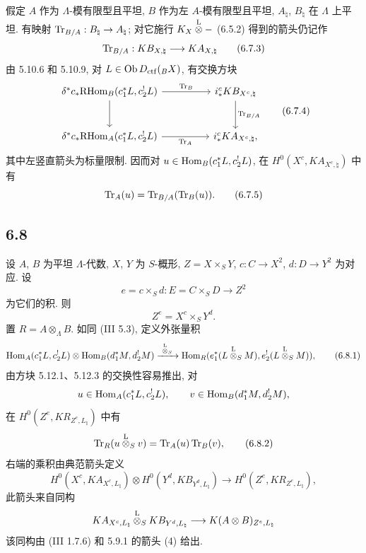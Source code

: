 假定 $A$ 作为 $\Lambda$-模有限型且平坦, $B$ 作为左 $A$-模有限型且平坦, $A_{\natural}$, $B_{\natural}$ 在 $\Lambda$ 上平坦. 有映射 $\operatorname{Tr}_{B/A}:B_{\natural}\to A_{\natural}$; 对它施行 $K_X\overset{\mathrm L}{\otimes} -$ (6.5.2) 得到的箭头仍记作
\begin{equation}
\operatorname{Tr}_{B/A}:KB_{X,\natural}\longrightarrow KA_{X,\natural}
\tag{6.7.3}
\end{equation}
由 5.10.6 和 5.10.9, 对 $L\in\operatorname{Ob} D_{\mathrm{ctf}}({}_BX)$, 有交换方块
\begin{equation}
\begin{tikzcd}[column sep=huge,row sep=large]
\delta^*c_*\RHom_B(c_1^*L,c_2^!L) \arrow[r,"\Tr_B"] \arrow[d]
& i_*^cKB_{X^c,\natural} \arrow[d,"\Tr_{B/A}"]\\
\delta^*c_*\RHom_A(c_1^*L,c_2^!L) \arrow[r,"\Tr_A"']
& i_*^cKA_{X^c,\natural},
\end{tikzcd}
\tag{6.7.4}
\end{equation}
其中左竖直箭头为标量限制. 因而对 $u\in\operatorname{Hom}_B(c_1^*L,c_2^!L)$, 在 $H^0(X^c,KA_{X^c,\natural})$ 中有
\begin{equation}
\operatorname{Tr}_A(u)=\operatorname{Tr}_{B/A}(\operatorname{Tr}_B(u)).
\tag{6.7.5}
\end{equation}

\subsection*{6.8}
设 $A$, $B$ 为平坦 $\Lambda$-代数, $X$, $Y$ 为 $S$-概形, $Z=X\times_SY$, $c:C\to X^2$, $d:D\to Y^2$ 为对应. 设
\[
e=c\times_Sd:E=C\times_SD\longrightarrow Z^2
\]
为它们的积. 则
\[
Z^e=X^c\times_SY^d.
\]
置 $R=A\otimes_{\Lambda}B$. 如同 (III 5.3), 定义外张量积
\begin{equation}
\operatorname{Hom}_A(c_1^*L,c_2^!L)\otimes \operatorname{Hom}_B(d_1^*M,d_2^!M)
\xrightarrow{\ \overset{\mathrm L}{\otimes}_S\ }
\operatorname{Hom}_R(e_1^*(L\overset{\mathrm L}{\otimes}_SM),e_2^!(L\overset{\mathrm L}{\otimes}_SM)),
\tag{6.8.1}
\end{equation}
由方块 5.12.1、5.12.3 的交换性容易推出, 对
\[
u\in\operatorname{Hom}_A(c_1^*L,c_2^!L),\qquad v\in\operatorname{Hom}_B(d_1^*M,d_2^!M),
\]
在 $H^0(Z^e,KR_{Z^e,L_{\natural}})$ 中有
\begin{equation}
\operatorname{Tr}_R(u\overset{\mathrm L}{\otimes}_Sv)=\operatorname{Tr}_A(u)\operatorname{Tr}_B(v),
\tag{6.8.2}
\end{equation}
右端的乘积由典范箭头定义
\begin{equation}
H^0(X^c,KA_{X^c,L_{\natural}})\otimes
H^0(Y^d,KB_{Y^d,L_{\natural}})
\longrightarrow
H^0(Z^e,KR_{Z^e,L_{\natural}}),
\tag{6.8.3}
\end{equation}
此箭头来自同构
\[
KA_{X^c,L_{\natural}}\overset{\mathrm L}{\otimes}_S KB_{Y^d,L_{\natural}}\longrightarrow K(A\otimes B)_{Z^e,L_{\natural}}
\]
该同构由 (III 1.7.6) 和 5.9.1 的箭头 (4) 给出.

